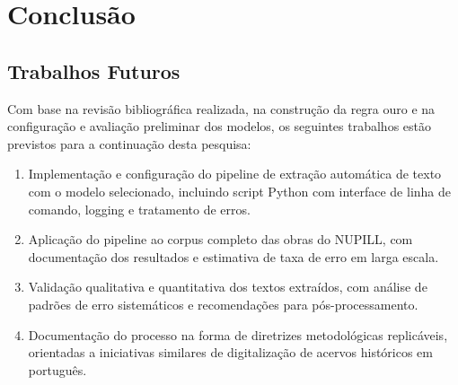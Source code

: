 \documentclass[
  12pt,
  oneside,
  a4paper,
  chapter=TITLE,
  section=TITLE,
  english,
  brazil
]{abntex2}
\begin{document}

\chapter{Conclusão}


\section{Trabalhos Futuros}

Com base na revisão bibliográfica realizada, na construção da regra ouro e na
configuração e avaliação preliminar dos modelos, os seguintes trabalhos estão previstos
para a continuação desta pesquisa:

\begin{enumerate}

    \item Implementação e configuração do pipeline de extração automática de texto
    com o modelo selecionado, incluindo script Python com interface de linha de comando,
    logging e tratamento de erros.

    \item Aplicação do pipeline ao corpus completo das obras do NUPILL, com
    documentação dos resultados e estimativa de taxa de erro em larga escala.

    \item Validação qualitativa e quantitativa dos textos extraídos, com análise de
    padrões de erro sistemáticos e recomendações para pós-processamento.

    \item Documentação do processo na forma de diretrizes metodológicas replicáveis,
    orientadas a iniciativas similares de digitalização de acervos históricos em
    português.
\end{enumerate}

\postextual



\end{document}
